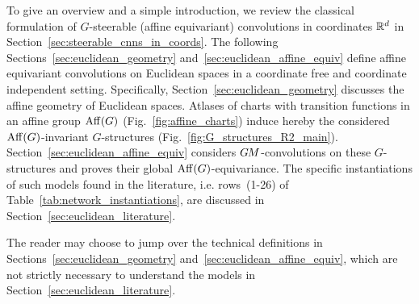To give an overview and a simple introduction, we review the classical formulation of $G$-steerable (affine equivariant) convolutions in coordinates $\mathbb{R}^d$ in Section~\ref{sec:steerable_cnns_in_coords}.
The following Sections~\ref{sec:euclidean_geometry} and~\ref{sec:euclidean_affine_equiv} define affine equivariant convolutions on Euclidean spaces in a coordinate free and coordinate independent setting.
Specifically, Section~\ref{sec:euclidean_geometry} discusses the affine geometry of Euclidean spaces.
Atlases of charts with transition functions in an affine group $\operatorname{Aff}(G)$ (Fig.~\ref{fig:affine_charts}) induce hereby the considered $\operatorname{Aff}(G)$-invariant $G$-structures (Fig.~\ref{fig:G_structures_R2_main}).
Section~\ref{sec:euclidean_affine_equiv} considers $G\mkern-1.4muM$-convolutions on these $G$-structures and proves their global $\operatorname{Aff}(G)$-equivariance.
The specific instantiations of such models found in the literature, i.e. rows~(1-26) of Table~\ref{tab:network_instantiations}, are discussed in Section~\ref{sec:euclidean_literature}.

The reader may choose to jump over the technical definitions in Sections~\ref{sec:euclidean_geometry} and~\ref{sec:euclidean_affine_equiv}, which are not strictly necessary to understand the models in Section~\ref{sec:euclidean_literature}.
